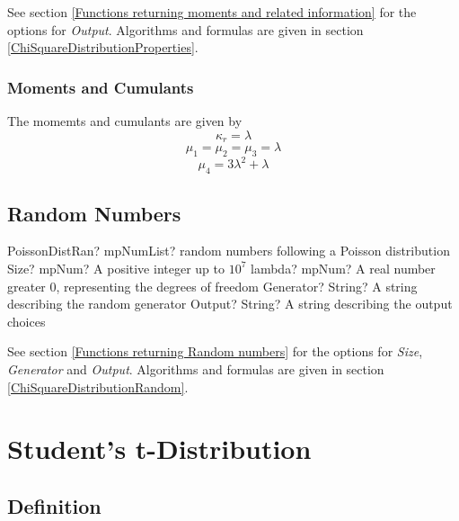 \vspace{0.3cm}

See section \ref{Functions returning moments and related information} for the options for {\itshape\sffamily Output}. Algorithms and formulas are given in section \ref{ChiSquareDistributionProperties}.

\subsubsection{Moments and Cumulants}
The momemts and cumulants are given by
\begin{equation}
	\kappa_{r} = \lambda
\end{equation}
\begin{equation}
	\mu_{1} = \mu_{2} =\mu_{3} = \lambda
\end{equation}
\begin{equation}
	\mu_{4} = 3 \lambda^2 + \lambda
\end{equation}


\subsection{Random Numbers}

\begin{mpFunctionsExtract}
	\mpFunctionFour
	{PoissonDistRan? mpNumList? random numbers following a Poisson distribution}
	{Size? mpNum? A positive integer up to $10^7$}
	{lambda? mpNum? A real number greater 0, representing the degrees of freedom}
	{Generator? String? A string describing the random generator}
	{Output? String? A string describing the output choices}
\end{mpFunctionsExtract}


\vspace{0.3cm}
See section \ref{Functions returning Random numbers} for the options for  {\itshape\sffamily Size},  {\itshape\sffamily Generator} and {\itshape\sffamily Output}. Algorithms and formulas are given in section \ref{ChiSquareDistributionRandom}.







\section{Student's t-Distribution}
\subsection{Definition}
\label{tDistributionDefinition}

